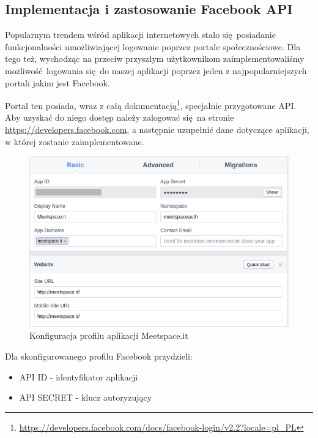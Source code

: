   

\subsection{Implementacja i zastosowanie Facebook API}
Popularnym trendem wśród aplikacji internetowych stało się posiadanie funkcjonalności umożliwiającej logowanie poprzez portale społecznościowe. Dla tego też, wychodząc na przeciw przyszłym użytkownikom zaimplementowaliśmy możliwość logowania się do naszej aplikacji poprzez jeden z najpopularniejszych portali jakim jest Facebook.

Portal ten posiada, wraz z całą dokumentacją\footnote{\url{https://developers.facebook.com/docs/facebook-login/v2.2?locale=pl\_PL}}, specjalnie przygotowane API. Aby uzyskać do niego dostęp należy zalogować się na stronie \url{https://developers.facebook.com}, a następnie uzupełnić dane dotyczące aplikacji, w której zostanie zaimplementowane. \\

\begin{figure}[h]
  \centering
    \includegraphics[scale=0.65]{images/fb_settings.png}
  \caption{Konfiguracja profilu aplikacji Meetspace.it}
\end{figure}

\clearpage

Dla skonfigurowanego profilu Facebook przydzieli:

\begin{itemize}
  \item API ID - identyfikator aplikacji
  \item API SECRET - klucz autoryzujący
\end{itemize}

